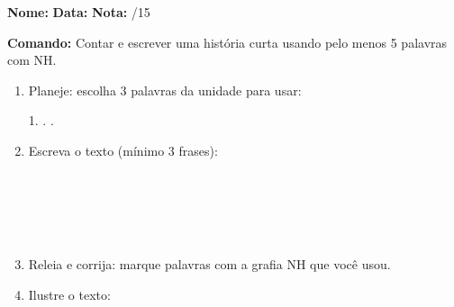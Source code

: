 \begin{exercicio}

\noindent\textbf{Nome:} \underline{\hspace{3.2cm}} \quad \textbf{Data:} \underline{\hspace{1.6cm}} \quad \textbf{Nota:} \underline{\hspace{0.9cm}}/15


\noindent\textbf{Comando:} Contar e escrever uma história curta usando pelo menos 5 palavras com NH.


\begin{enumerate}

  \item Planeje: escolha 3 palavras da unidade para usar:
  \begin{center}
  1. \underline{\hspace{3cm}} . \underline{\hspace{3cm}} . \underline{\hspace{3cm}}
  \end{center}

  \item Escreva o texto (mínimo 3 frases):
  \begin{center}
  \underline{\hspace{12cm}}\\\underline{\hspace{12cm}}\\\underline{\hspace{12cm}}\\\underline{\hspace{12cm}}\\\underline{\hspace{12cm}}
  \end{center}

  \item Releia e corrija: marque palavras com a grafia NH que você usou.

  \item Ilustre o texto:
  \begin{center}
  \end{center}

\end{enumerate}

\end{exercicio}

